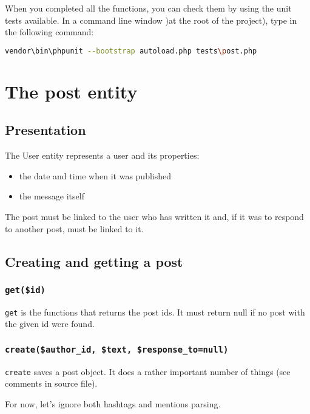 \documentclass[twoside,a4paper,12pt]{article}
\begin{document}
When you completed all the functions, you can check them by using the unit tests available. In a command line window )at the root of the project), type in the following command:

\begin{lstlisting}[language=bash]
vendor\bin\phpunit --bootstrap autoload.php tests\post.php
\end{lstlisting}

\section{The post entity}

\subsection{Presentation}

The User entity represents a user and its properties:

\begin{itemize}
\item the date and time when it was published
\item the message itself
\end{itemize}

The post must be linked to the user who has written it and, if it was to respond to another post, must be linked to it.

\subsection{Creating and getting a post}

\subsubsection{\texttt{get(\$id)}}

\texttt{get} is the functions that returns the post ids. It must return null if no post with the given id were found.

\subsubsection{\texttt{create(\$author\_id, \$text, \$response\_to=null)}}

\texttt{create} saves a post object. It does a rather important number of things (see comments in source file).

For now, let's ignore both hashtags and mentions parsing.
\end{document}
